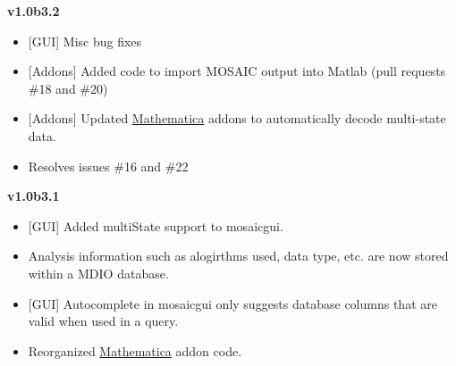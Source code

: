 \documentclass[letterpaper,10pt,english]{sphinxmanual}
\begin{document}
\textbf{v1.0b3.2}
\begin{itemize}
\item {} 
{[}GUI{]} Misc bug fixes

\item {} 
{[}Addons{]} Added code to import MOSAIC output into Matlab (pull requests \#18 and \#20)

\item {} 
{[}Addons{]} Updated \href{http://www.wolfram.com/mathematica/}{Mathematica} addons to automatically decode multi-state data.

\item {} 
Resolves issues \#16 and \#22

\end{itemize}

\textbf{v1.0b3.1}
\begin{itemize}
\item {} 
{[}GUI{]} Added multiState support to mosaicgui.

\item {} 
Analysis information such as alogirthms used, data type, etc. are now stored within a MDIO database.

\item {} 
{[}GUI{]} Autocomplete in mosaicgui only suggests database columns that are valid when used in a query.

\item {} 
Reorganized \href{http://www.wolfram.com/mathematica/}{Mathematica} addon code.

\end{itemize}
\end{document}
